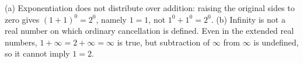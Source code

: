 (a) Exponentiation does not distribute over addition: raising the original sides to zero gives $(1+1)^0=2^0$, namely $1=1$, not $1^0+1^0=2^0$. (b) Infinity is not a real number on which ordinary cancellation is defined. Even in the extended real numbers, $1+\infty=2+\infty=\infty$ is true, but subtraction of $\infty$ from $\infty$ is undefined, so it cannot imply $1=2$.
